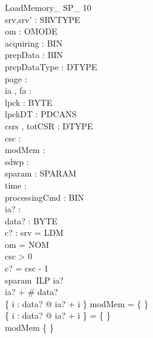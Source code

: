 \begin{schema}{LoadMemory\_ SP\_ 10}\\
 srv,srv' : SRVTYPE \\
 om : OMODE \\
 acquiring : BIN \\
 prepData : BIN \\
 prepDataType : DTYPE \\
 page : \nat \\
 ia , fa : \nat \\
 lpck : \seq BYTE \\
 lpckDT : PDCANS \\
 csrs , totCSR : DTYPE \fun \nat \\
 csc : \nat \\
 modMem : \power \nat \\
 sdwp : \nat \\
 sparam : SPARAM \fun \nat \\
 time : \nat \\
 processingCmd : BIN \\
 ia? : \nat \\
 data? : \seq BYTE \\
 c? : \nat 
\where
 srv = LDM \\
 om = NOM \\
 csc > 0 \\
 c? = csc - 1 \\
 sparam~ILP \leq ia? \\
 ia? + \# data?   \\
 \{ i : \dom data? @ ia? + i \} \cap modMem = \{ \} \\
 \{ i : \dom data? @ ia? + i \} = \{ \} \\
 modMem \neq \{ \}
\end{schema}


